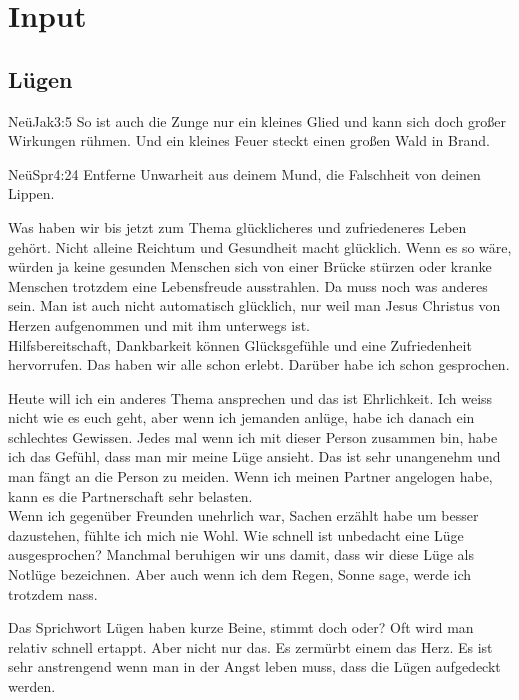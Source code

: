 \documentclass{../inc/mybib}
\begin{document}
\section{ Input }
\begin{spacing}{1.5}
\subsection{Lügen}

\begin{bibelbox}{Neü}{Jak}{3:5}
So ist auch die Zunge nur ein kleines Glied und kann sich doch großer Wirkungen rühmen. Und ein kleines Feuer steckt einen großen Wald in Brand.
\end{bibelbox}
\begin{bibelbox}{Neü}{Spr}{4:24}
Entferne Unwarheit aus deinem Mund, die Falschheit von deinen Lippen.
\end{bibelbox}

Was haben wir bis jetzt zum Thema glücklicheres und zufriedeneres Leben gehört. Nicht alleine Reichtum und Gesundheit macht glücklich. Wenn es so wäre, würden ja keine gesunden Menschen sich von einer Brücke stürzen oder kranke Menschen trotzdem eine Lebensfreude ausstrahlen. Da muss noch was anderes sein. Man ist auch nicht automatisch glücklich, nur weil man Jesus Christus von Herzen aufgenommen und mit ihm unterwegs ist.\\
Hilfsbereitschaft, Dankbarkeit können Glücksgefühle und eine Zufriedenheit hervorrufen. Das haben wir alle schon erlebt. Darüber habe ich schon gesprochen.

Heute will ich ein anderes Thema ansprechen und das ist Ehrlichkeit. Ich weiss nicht wie es euch geht, aber wenn ich jemanden anlüge, habe ich danach ein schlechtes Gewissen. Jedes mal wenn ich mit dieser Person zusammen bin, habe ich das Gefühl, dass man mir meine Lüge ansieht. Das ist sehr unangenehm und man fängt an die Person zu meiden. Wenn ich meinen Partner angelogen habe, kann es die Partnerschaft sehr belasten.\\
Wenn ich gegenüber Freunden unehrlich war, Sachen erzählt habe um besser dazustehen, fühlte ich mich nie Wohl. Wie schnell ist unbedacht eine Lüge ausgesprochen? Manchmal beruhigen wir uns damit, dass wir diese Lüge als Notlüge bezeichnen. Aber auch wenn ich dem Regen, Sonne sage, werde ich trotzdem nass.

Das Sprichwort Lügen haben kurze Beine, stimmt doch oder? Oft wird man relativ schnell ertappt. Aber nicht nur das. Es zermürbt einem das Herz. Es ist sehr anstrengend wenn man in der Angst leben muss, dass die Lügen aufgedeckt werden.


\end{spacing}
\end{document}
